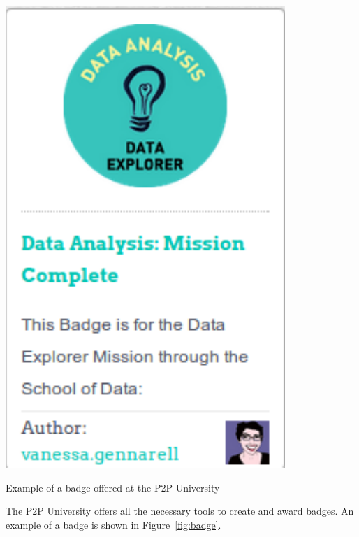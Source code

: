 \documentclass{tufte-book} %
\begin{document}
\begin{marginfigure}
\includegraphics[width=\linewidth]{badge}
\caption{Example of a badge offered at the P2P University}
\label{fig:badge}
\end{marginfigure}

The P2P University offers all the necessary tools to create and award badges.
An example of a badge is shown in Figure~\ref{fig:badge}.

\end{document}
